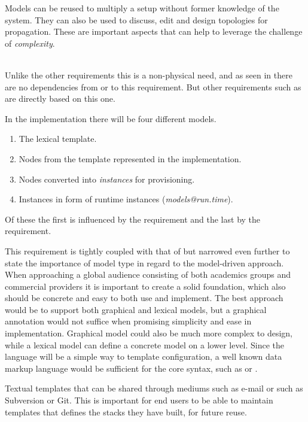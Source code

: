 Models can be reused to multiply a setup without former knowledge of the system.
They can also be used to discuss, edit and design topologies for propagation. 
These are important aspects that can help to leverage the challenge of \emph{complexity}.

 \\
Unlike the other requirements this is a non-physical need, 
and as seen in 
there are no dependencies from or to this requirement.
But other requirements such as  are directly based on this one.

In the implementation there will be four different models.
\begin{enumerate}
  \item The lexical template.
  \item Nodes from the template represented in the implementation.
  \item Nodes converted into \emph{instances} for provisioning.
  \item Instances in form of runtime instances (\emph{models@run.time}).
\end{enumerate}
Of these the first is influenced by the  requirement and
the last by the  requirement.

This requirement is tightly coupled with that of  but narrowed 
even further to state the importance of model type in regard to the model-driven approach.
When approaching a global audience consisting of both academics groups and commercial
providers it is important to create a solid foundation, 
which also should be concrete and easy to both use and implement.
The best approach would be to support both graphical and lexical models, 
but a graphical annotation would not suffice when promising simplicity and ease in implementation. 
Graphical model could also be much more complex to design, 
while a lexical model can define a concrete model on a lower level.
Since the language will be a simple way to template configuration, 
a well known data markup language would be sufficient for the core syntax, such as 
 or .

Textual templates that can be shared through mediums such as e-mail or 
 such as Subversion or Git.
This is important for end users to be able to maintain templates that defines the stacks they have built, 
for future reuse.

